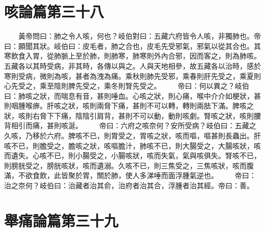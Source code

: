 \section{咳論篇第三十八}

　　黃帝問曰：肺之令人咳，何也？岐伯對曰：五藏六府皆令人咳，非獨肺也。帝曰：願聞其狀。岐伯曰：皮毛者，肺之合也，皮毛先受邪氣，邪氣以從其合也。其寒飲食入胃，從肺脈上至於肺，則肺寒，肺寒則外內合邪，因而客之，則為肺咳。五藏各以其時受病，非其時，各傳以與之。人與天地相參，故五藏各以治時，感於寒則受病，微則為咳，甚者為洩為痛。乘秋則肺先受邪，乘春則肝先受之，乘夏則心先受之，乘至陰則脾先受之，乘冬則腎先受之。
　　帝曰：何以異之？岐伯曰：肺咳之狀，而喘息有音，甚則唾血。心咳之狀，則心痛，喉中介介如梗狀，甚則咽腫喉痹。肝咳之狀，咳則兩脅下痛，甚則不可以轉，轉則兩胠下滿。脾咳之狀，咳則右脅下下痛，陰陰引肩背，甚則不可以動，動則咳劇。腎咳之狀，咳則腰背相引而痛，甚則咳涎。
　　帝曰：六府之咳奈何？安所受病？岐伯曰：五藏之久咳，乃移於六府。脾咳不已，則胃受之，胃咳之狀，咳而嘔，嘔甚則長蟲出。肝咳不已，則膽受之，膽咳之狀，咳嘔膽汁，肺咳不已，則大腸受之，大腸咳狀，咳而遺失。心咳不已，則小腸受之，小腸咳狀，咳而失氣，氣與咳俱失。腎咳不已，則膀胱受之，膀胱咳狀，咳而遺溺。久咳不已，則三焦受之，三焦咳狀，咳而腹滿，不欲食飲，此皆聚於胃，關於肺，使人多涕唾而面浮腫氣逆也。
　　帝曰：治之奈何？岐伯曰：治藏者治其俞，治府者治其合，浮腫者治其經。帝曰：善。


\section{舉痛論篇第三十九}


